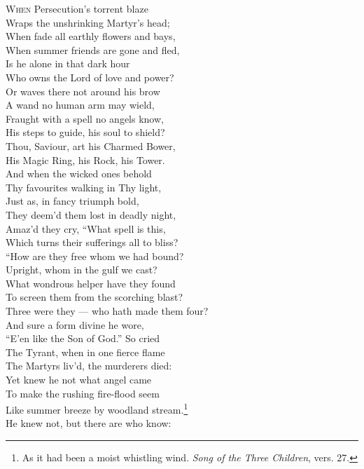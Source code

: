 \textsc{When} Persecution’s torrent blaze \\
 Wraps the unshrinking Martyr’s head; \\
 When fade all earthly flowers and bays, \\
 When summer friends are gone and fled, \\
 Is he alone in that dark hour \\
 Who owns the Lord of love and power? \\
  Or waves there not around his brow \\
 A wand no human arm may wield, \\
 Fraught with a spell no angels know, \\
 His steps to guide, his soul to shield? \\
 Thou, Saviour, art his Charmed Bower, \\
 His Magic Ring, his Rock, his Tower. \\
  And when the wicked ones behold \\
 Thy favourites walking in Thy light, \\
 Just as, in fancy triumph bold, \\
 They deem’d them lost in deadly night, \\
 Amaz’d they cry, “What spell is this, \\
 Which turns their sufferings all to bliss? \\
  “How are they free whom we had bound? \\
 Upright, whom in the gulf we cast? \\
 What wondrous helper have they found \\
 To screen them from the scorching blast? \\
 Three were they — who hath made them four? \\
 And sure a form divine he wore, \\
  “E’en like the Son of God.” So cried \\
 The Tyrant, when in one fierce flame \\
 The Martyrs liv’d, the murderers died: \\
 Yet knew he not what angel came \\
 To make the rushing fire-flood seem \\
 Like summer breeze by woodland stream.\footnote{As it had been a moist whistling wind. \emph{Song of the Three Children}, vers. 27.} \\
  He knew not, but there are who know: \\

